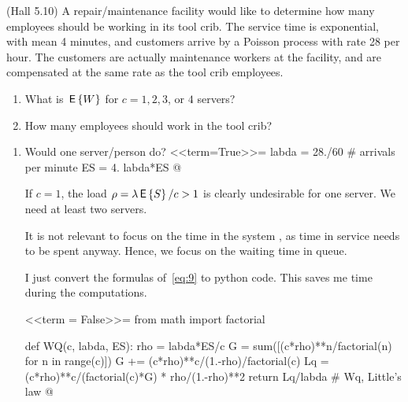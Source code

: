 \begin{question}
  (Hall 5.10) A repair/maintenance facility would like to determine
  how many employees should be working in its tool crib. The service
  time is exponential, with mean 4 minutes, and customers arrive by a
  Poisson process with rate 28 per hour. The customers are actually
  maintenance workers at the facility, and are compensated at the same
  rate as the tool crib employees.
  \begin{enumerate}
  \item What is $\,\mathsf{E}\left\{W\right\}$ for $c=1, 2, 3$, or $4$ servers?
  \item How many employees should work in the tool crib?
  \end{enumerate}

  \begin{solution}
    \begin{enumerate}
    \item 
      Would one server/person do? 
<<term=True>>=
labda = 28./60 # arrivals per minute
ES = 4.
labda*ES
@ 

If $c=1$, the load $\rho=\lambda \,\mathsf{E}\left\{S\right\}/c >1$ is clearly undesirable for one server.  We need at
least two servers.

It is not relevant to focus on the time in the system , as time
  in service needs to be spent anyway. Hence, we focus on the waiting
  time in queue.


I just convert the formulas of~\eqref{eq:9} to python code. This saves
me time during the computations.

<<term = False>>=
from math import factorial

def WQ(c, labda, ES):
    rho = labda*ES/c
    G = sum([(c*rho)**n/factorial(n) for n in range(c)])
    G += (c*rho)**c/(1.-rho)/factorial(c)
    Lq = (c*rho)**c/(factorial(c)*G) * rho/(1.-rho)**2
    return Lq/labda # Wq, Little's law
@ 


\end{enumerate}
\end{solution}
\end{question}
